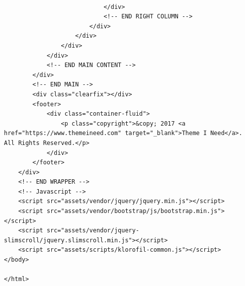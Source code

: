 \begin{verbatim}
						
							</div>
							<!-- END RIGHT COLUMN -->
						</div>
					</div>
				</div>
			</div>
			<!-- END MAIN CONTENT -->
		</div>
		<!-- END MAIN -->
		<div class="clearfix"></div>
		<footer>
			<div class="container-fluid">
				<p class="copyright">&copy; 2017 <a href="https://www.themeineed.com" target="_blank">Theme I Need</a>. All Rights Reserved.</p>
			</div>
		</footer>
	</div>
	<!-- END WRAPPER -->
	<!-- Javascript -->
	<script src="assets/vendor/jquery/jquery.min.js"></script>
	<script src="assets/vendor/bootstrap/js/bootstrap.min.js"></script>
	<script src="assets/vendor/jquery-slimscroll/jquery.slimscroll.min.js"></script>
	<script src="assets/scripts/klorofil-common.js"></script>
</body>

</html>

\end{verbatim}


